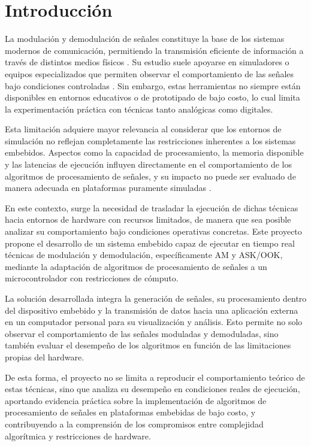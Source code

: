 \chapter{Introducción}
\label{chp:intro}
\vspace{-1em}

La modulación y demodulación de señales constituye la base de los sistemas modernos de comunicación, permitiendo la transmisión eficiente de información a través de distintos medios físicos \cite{haykin2001}. Su estudio suele apoyarse en simuladores o equipos especializados que permiten observar el comportamiento de las señales bajo condiciones controladas \cite{oppenheim1997}. Sin embargo, estas herramientas no siempre están disponibles en entornos educativos o de prototipado de bajo costo, lo cual limita la experimentación práctica con técnicas tanto analógicas como digitales.

Esta limitación adquiere mayor relevancia al considerar que los entornos de simulación no reflejan completamente las restricciones inherentes a los sistemas embebidos. Aspectos como la capacidad de procesamiento, la memoria disponible y las latencias de ejecución influyen directamente en el comportamiento de los algoritmos de procesamiento de señales, y su impacto no puede ser evaluado de manera adecuada en plataformas puramente simuladas \cite{heath2002}.

En este contexto, surge la necesidad de trasladar la ejecución de dichas técnicas hacia entornos de hardware con recursos limitados, de manera que sea posible analizar su comportamiento bajo condiciones operativas concretas. Este proyecto propone el desarrollo de un sistema embebido capaz de ejecutar en tiempo real técnicas de modulación y demodulación, específicamente AM y ASK/OOK, mediante la adaptación de algoritmos de procesamiento de señales a un microcontrolador con restricciones de cómputo.

La solución desarrollada integra la generación de señales, su procesamiento dentro del dispositivo embebido y la transmisión de datos hacia una aplicación externa en un computador personal para su visualización y análisis. Esto permite no solo observar el comportamiento de las señales moduladas y demoduladas, sino también evaluar el desempeño de los algoritmos en función de las limitaciones propias del hardware.

De esta forma, el proyecto no se limita a reproducir el comportamiento teórico de estas técnicas, sino que analiza su desempeño en condiciones reales de ejecución, aportando evidencia práctica sobre la implementación de algoritmos de procesamiento de señales en plataformas embebidas de bajo costo, y contribuyendo a la comprensión de los compromisos entre complejidad algorítmica y restricciones de hardware.


